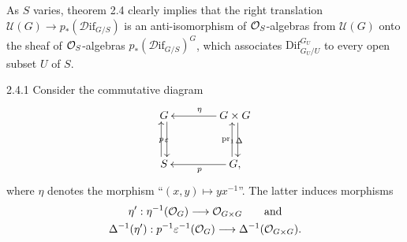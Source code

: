 As $S$ varies, theorem 2.4 clearly implies that the right translation $\mathscr U(G)\to p_*(\mathscr D\!\mathrm{if}_{G/S})$ is an anti-isomorphism of $\mathcal{O}_S$-algebras from $\mathscr U(G)$ onto the sheaf of $\mathcal{O}_S$-algebras $p_*(\mathscr D\!\mathrm{if}_{G/S})^G$, which associates $\mathrm{Dif}_{G_U/U}^{G_U}$ to every open subset $U$ of $S$.

\begin{remark}{2.4.1}\label{VIIA.2.4.1}
Consider the commutative diagram
\[
\xymatrix@C=4em@R=3em{G\ar@<0.6ex>[d]_p&G\times G\ar[l]_\eta\ar@<0.6ex>[d]_{\mathrm{pr}_1}\\
S\ar@<0.6ex>[u]_\varepsilon&G\ar[l]^p\ar@<0.6ex>[u]_\Delta,}
\]
where $\eta$ denotes the morphism ``$(x,y)\mapsto yx^{-1}$''. The latter induces morphisms
\[
\begin{gathered}
\eta':\eta^{-1}(\mathcal{O}_G)\longrightarrow\mathcal{O}_{G\times G}\qquad\text{and}\\
\Delta^{-1}(\eta'):p^{-1}\varepsilon^{-1}(\mathcal{O}_G)\longrightarrow\Delta^{-1}(\mathcal{O}_{G\times G}).
\end{gathered}
\]
\end{remark}
